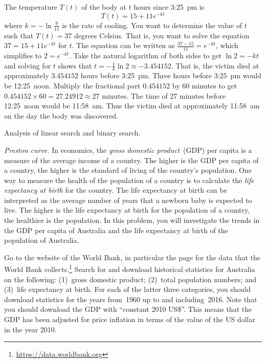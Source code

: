 \documentclass[a4paper,oneside,12pt]{article}
\begin{document}
\begin{problem}
{\begin{solution}
The temperature $T(t)$ of the body at $t$ hours since 3:25~pm is
\[
T(t)
=
15 + 11 e^{-kt}
\]
where $k = -\ln \frac{9}{11}$ is the rate of cooling.  You want to
determine the value of $t$ such that $T(t) = 37$ degrees Celsius.
That is, you want to solve the equation $37 = 15 + 11 e^{-kt}$ for
$t$.  The equation can be written as
$\frac{37 - 15}{11} = e^{-kt}$, which simplifies to $2 = e^{-kt}$.
Take the natural logarithm of both sides to get $\ln 2 = -kt$ and
solving for $t$ shows that
$t = -\frac{1}{k} \ln 2 \approx -3.454152$.  That is, the victim died
at approximately $3.454152$ hours before 3:25~pm.  Three hours before
3:25~pm would be 12:25~noon.  Multiply the fractional part $0.454152$
by $60$ minutes to get $0.454152 \times 60 = 27.24912 \approx 27$
minutes.  The time of $27$ minutes before 12:25~noon would be
11:58~am.  Thus the victim died at approximately 11:58~am on the day
the body was discovered.
\end{solution}
}{}

\item Analysis of linear search and binary search.

\item\emph{Preston curve.}
  In economics, the \emph{gross domestic product}~(GDP) per capita is
  a measure of the average income of a country.  The higher is the GDP
  per capita of a country, the higher is the standard of living of the
  country's population.  One way to measure the health of the
  population of a country is to calculate the
  \emph{life expectancy at birth} for the country.  The life
  expectancy at birth can be interpreted as the average number of
  years that a newborn baby is expected to live.  The higher is the
  life expectancy at birth for the population of a country, the
  healthier is the population.  In this problem, you will investigate
  the trends in the GDP per capita of Australia and the life
  expectancy at birth of the population of Australia.
  \begin{packedenum}
  \item\label{subprob:logarithm:Australia_data}
    Go to the website of the World Bank, in particular the page for
    the data that the World Bank collects.\footnote{
      \url{https://data.worldbank.org}
    }
    Search for and download historical statistics for Australia on the
    following: (1)~gross domestic product; (2)~total population
    numbers; and (3)~life expectancy at birth.  For each of the latter
    three categories, you should download statistics for the years
    from~1960 up to and including~2016.  Note that you should download
    the GDP with ``constant 2010 US\$''.  This means that the GDP has
    been adjusted for price inflation in terms of the value of the US
    dollar in the year 2010.


\end{packedenum}
\end{problem}
\end{document}
